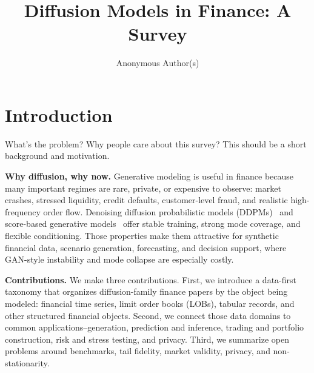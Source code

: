\documentclass[sigconf,nonacm]{acmart}
\begin{document}
\title{Diffusion Models in Finance: A Survey}

\author{Anonymous Author(s)}

\renewcommand{\shortauthors}{Anonymous Author(s)}

\begin{abstract}

\end{abstract}


\maketitle

\section{Introduction}

What's the problem? Why people care about this survey? This should be a short background and motivation.

\textbf{Why diffusion, why now.}
Generative modeling is useful in finance because many important regimes are rare,
private, or expensive to observe: market crashes, stressed liquidity, credit
defaults, customer-level fraud, and realistic high-frequency order flow.
Denoising diffusion probabilistic models (DDPMs)~\cite{ho2020ddpm} and
score-based generative models~\cite{song2019ncsn,song2021sde} offer stable
training, strong mode coverage, and flexible conditioning. Those properties make
them attractive for synthetic financial data, scenario generation, forecasting,
and decision support, where GAN-style instability and mode collapse are
especially costly.

\textbf{Contributions.}
We make three contributions. First, we introduce a data-first taxonomy that
organizes diffusion-family finance papers by the object being modeled:
financial time series, limit order books (LOBs), tabular records, and other
structured financial objects. Second, we connect those data domains to common
applications--generation, prediction and inference, trading and portfolio
construction, risk and stress testing, and privacy. Third, we summarize open
problems around benchmarks, tail fidelity, market validity, privacy, and
non-stationarity.
\end{document}
